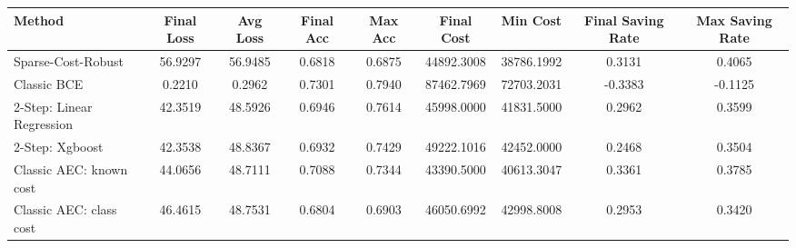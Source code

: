 \begin{tabular}{lcccccccc}
\toprule
Method & Final Loss & Avg Loss & Final Acc & Max Acc & Final Cost & Min Cost & Final Saving Rate & Max Saving Rate \\
\midrule
Sparse-Cost-Robust & 56.9297 & 56.9485 & 0.6818 & 0.6875 & 44892.3008 & 38786.1992 & 0.3131 & 0.4065 \\
Classic BCE & 0.2210 & 0.2962 & 0.7301 & 0.7940 & 87462.7969 & 72703.2031 & -0.3383 & -0.1125 \\
2-Step: Linear Regression & 42.3519 & 48.5926 & 0.6946 & 0.7614 & 45998.0000 & 41831.5000 & 0.2962 & 0.3599 \\
2-Step: Xgboost & 42.3538 & 48.8367 & 0.6932 & 0.7429 & 49222.1016 & 42452.0000 & 0.2468 & 0.3504 \\
Classic AEC: known cost & 44.0656 & 48.7111 & 0.7088 & 0.7344 & 43390.5000 & 40613.3047 & 0.3361 & 0.3785 \\
Classic AEC: class cost & 46.4615 & 48.7531 & 0.6804 & 0.6903 & 46050.6992 & 42998.8008 & 0.2953 & 0.3420 \\
\bottomrule
\end{tabular}
